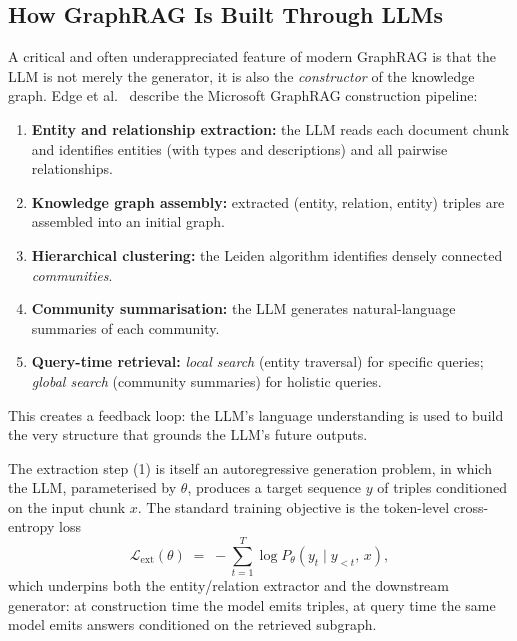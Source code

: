 \documentclass[12pt,a4paper,oneside]{report}
\begin{document}
\subsection{How GraphRAG Is Built Through LLMs}

A critical and often underappreciated feature of modern GraphRAG is that the
LLM is not merely the generator, it is also the \emph{constructor} of the
knowledge graph. Edge et al.~\citep{edge2024} describe the Microsoft GraphRAG
construction pipeline:
\begin{enumerate}[leftmargin=2em,itemsep=2pt]
    \item \textbf{Entity and relationship extraction:} the LLM reads each
          document chunk and identifies entities (with types and
          descriptions) and all pairwise relationships.
    \item \textbf{Knowledge graph assembly:} extracted (entity, relation,
          entity) triples are assembled into an initial graph.
    \item \textbf{Hierarchical clustering:} the Leiden algorithm identifies
          densely connected \emph{communities}.
    \item \textbf{Community summarisation:} the LLM generates natural-language
          summaries of each community.
    \item \textbf{Query-time retrieval:} \emph{local search} (entity
          traversal) for specific queries; \emph{global search} (community
          summaries) for holistic queries.
\end{enumerate}

This creates a feedback loop: the LLM's language understanding is used to
build the very structure that grounds the LLM's future outputs.

The extraction step (1) is itself an autoregressive generation problem,
in which the LLM, parameterised by $\theta$, produces a target sequence
$y$ of triples conditioned on the input chunk $x$. The standard
training objective is the token-level cross-entropy loss
\citep{lewis2020,yang2024}
\begin{equation}
    \mathcal{L}_{\mathrm{ext}}(\theta) \;=\; -\sum_{t=1}^{T} \log P_\theta\!\left(y_t \mid y_{<t},\, x\right),
    \label{eq:extraction_loss}
\end{equation}
which underpins both the entity/relation extractor and the downstream
generator: at construction time the model emits triples, at query time
the same model emits answers conditioned on the retrieved subgraph.
\end{document}
